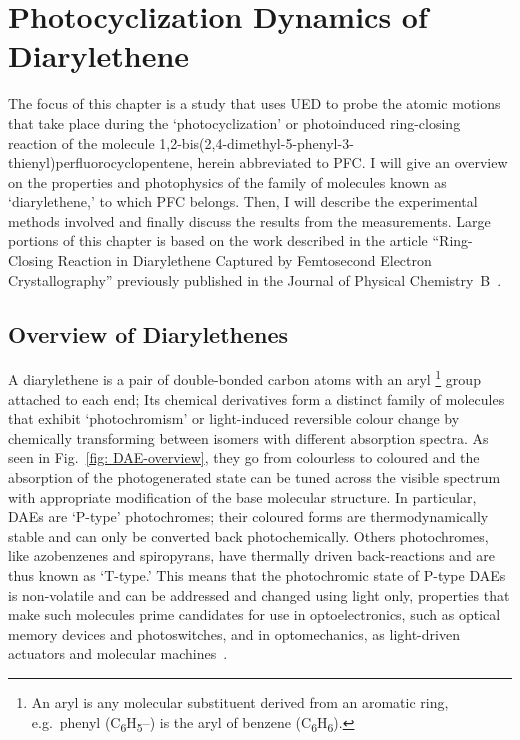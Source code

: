 
\chapter{Photocyclization Dynamics of Diarylethene}
\label{ch: UED-DAE}

The focus of this chapter is a study that uses UED to probe the atomic motions
that take place during the `photocyclization' or
photoinduced ring-closing reaction of the molecule
1,2-bis(2,4-dimethyl-5-phenyl-3-thienyl)perfluorocyclopentene,
herein abbreviated to PFC.
%
I will give an overview on the properties and photophysics of the family of molecules
known as `diarylethene,' to which PFC belongs.
%
Then, I will describe the experimental methods involved and
finally discuss the results from the measurements. Large portions of this chapter
is based on the work described in the article ``Ring-Closing Reaction in Diarylethene
Captured by Femtosecond Electron Crystallography'' previously published in
the Journal of Physical Chemistry~B~\cite{Jean-Ruel2013}.

\section{Overview of Diarylethenes}
\label{sec: UED-DAE-Intro}

A diarylethene is a pair of double-bonded carbon atoms with an aryl%
\footnote{An aryl is any molecular substituent derived from an aromatic ring,
e.g.~phenyl (C\textsubscript{6}H\textsubscript{5}--) is
the aryl of benzene (C\textsubscript{6}H\textsubscript{6}).} group attached to each end;
%
Its chemical derivatives form a distinct family of molecules that exhibit `photochromism' or
light-induced reversible colour change by chemically transforming between isomers
with different absorption spectra.
%
As seen in Fig.~\ref{fig: DAE-overview}, they go from colourless to coloured and
the absorption of the photogenerated state can be tuned across the visible spectrum
with appropriate modification of the base molecular structure.
%
In particular, DAEs are `P-type' photochromes;
their coloured forms are thermodynamically stable and can only be converted back photochemically.
Others photochromes, like azobenzenes and spiropyrans, have thermally driven back-reactions
and are thus known as `T-type.'
%
This means that the photochromic state of P-type DAEs is non-volatile and
can be addressed and changed using light only, properties that make such molecules
prime candidates for use in optoelectronics, such as optical memory devices and photoswitches,
and in optomechanics, as light-driven actuators and molecular machines~\cite{Irie2000, Irie2014}.

